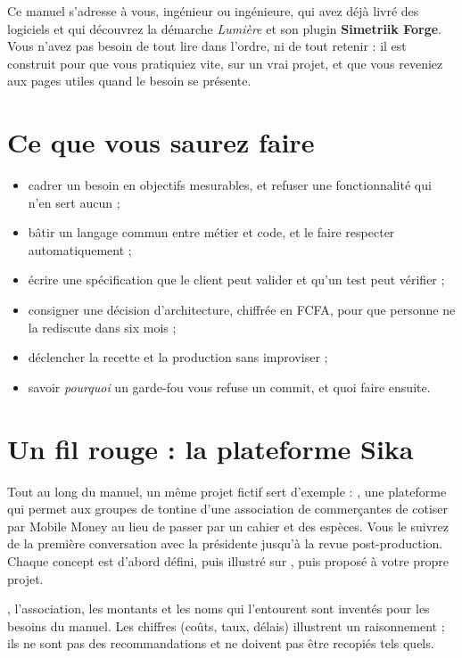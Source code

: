 
Ce manuel s'adresse à vous, ingénieur ou ingénieure, qui avez déjà livré des logiciels et
qui découvrez la démarche \emph{Lumière} et son plugin \textbf{Simetriik Forge}. Vous n'avez pas besoin
de tout lire dans l'ordre, ni de tout retenir : il est construit pour que vous pratiquiez vite, sur
un vrai projet, et que vous reveniez aux pages utiles quand le besoin se présente.

\section*{Ce que vous saurez faire}
\begin{itemize}
  \item cadrer un besoin en objectifs mesurables, et refuser une fonctionnalité qui n'en sert aucun ;
  \item bâtir un langage commun entre métier et code, et le faire respecter automatiquement ;
  \item écrire une spécification que le client peut valider et qu'un test peut vérifier ;
  \item consigner une décision d'architecture, chiffrée en FCFA, pour que personne ne la rediscute dans six mois ;
  \item déclencher la recette et la production sans improviser ;
  \item savoir \emph{pourquoi} un garde-fou vous refuse un commit, et quoi faire ensuite.
\end{itemize}

\section*{Un fil rouge : la plateforme Sika}
Tout au long du manuel, un même projet fictif sert d'exemple : \sika{}, une plateforme qui permet aux
groupes de tontine d'une association de commerçantes de cotiser par Mobile Money au lieu de
passer par un cahier et des espèces. Vous le suivrez de la première conversation avec la
présidente jusqu'à la revue post-production. Chaque concept est d'abord défini, puis
illustré sur \sika{}, puis proposé à votre propre projet.

\begin{situation}[Fiction]
\sika{}, l'association, les montants et les noms qui l'entourent sont inventés pour les besoins du
manuel. Les chiffres (coûts, taux, délais) illustrent un raisonnement ; ils ne sont pas des
recommandations et ne doivent pas être recopiés tels quels.
\end{situation}

